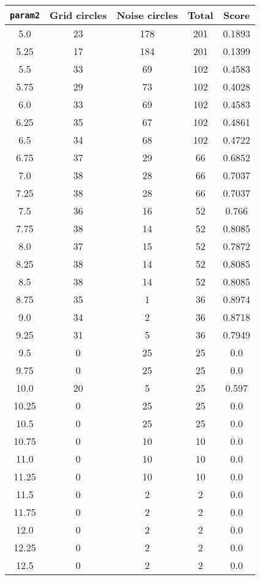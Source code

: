 \documentclass[letterpaper, 12pt]{article}
\begin{document}
\begin{longtable}{|c|c|c|c|c|}
\hline
\textbf{\texttt{param2}} & \textbf{Grid circles} & \textbf{Noise circles} & \textbf{Total} & \textbf{Score} \\
\hline
5.0 & 23 & 178 & 201 & 0.1893 \\
\hline
5.25 & 17 & 184 & 201 & 0.1399 \\
\hline
5.5 & 33 & 69 & 102 & 0.4583 \\
\hline
5.75 & 29 & 73 & 102 & 0.4028 \\
\hline
6.0 & 33 & 69 & 102 & 0.4583 \\
\hline
6.25 & 35 & 67 & 102 & 0.4861 \\
\hline
6.5 & 34 & 68 & 102 & 0.4722 \\
\hline
6.75 & 37 & 29 & 66 & 0.6852 \\
\hline
7.0 & 38 & 28 & 66 & 0.7037 \\
\hline
7.25 & 38 & 28 & 66 & 0.7037 \\
\hline
7.5 & 36 & 16 & 52 & 0.766 \\
\hline
7.75 & 38 & 14 & 52 & 0.8085 \\
\hline
8.0 & 37 & 15 & 52 & 0.7872 \\
\hline
8.25 & 38 & 14 & 52 & 0.8085 \\
\hline
8.5 & 38 & 14 & 52 & 0.8085 \\
\hline
8.75 & 35 & 1 & 36 & 0.8974 \\
\hline
9.0 & 34 & 2 & 36 & 0.8718 \\
\hline
9.25 & 31 & 5 & 36 & 0.7949 \\
\hline
9.5 & 0 & 25 & 25 & 0.0 \\
\hline
9.75 & 0 & 25 & 25 & 0.0 \\
\hline
10.0 & 20 & 5 & 25 & 0.597 \\
\hline
10.25 & 0 & 25 & 25 & 0.0 \\
\hline
10.5 & 0 & 25 & 25 & 0.0 \\
\hline
10.75 & 0 & 10 & 10 & 0.0 \\
\hline
11.0 & 0 & 10 & 10 & 0.0 \\
\hline
11.25 & 0 & 10 & 10 & 0.0 \\
\hline
11.5 & 0 & 2 & 2 & 0.0 \\
\hline
11.75 & 0 & 2 & 2 & 0.0 \\
\hline
12.0 & 0 & 2 & 2 & 0.0 \\
\hline
12.25 & 0 & 2 & 2 & 0.0 \\
\hline
12.5 & 0 & 2 & 2 & 0.0 \\

\end{longtable}
\end{document}
